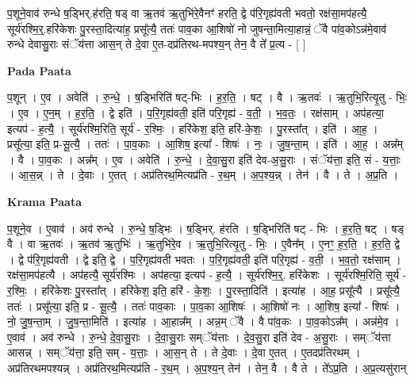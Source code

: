 \documentclass[17pt]{extarticle}
\begin{document}
प॒शूने॒वाव॑ रुन्धे ष॒ड्भिर्.ह॑रति॒ षड् वा ऋ॒तव॑ ऋ॒तुभि॑रे॒वैनꣳ॑ हरति॒ द्वे प॑रि॒गृह्य॑वती भवतो॒ रक्ष॑सा॒मप॑हत्यै॒ सूर्य॑रश्मि॒र्॒.हरि॑केशः पु॒रस्ता॒दित्या॑ह॒ प्रसू᳚त्यै॒ ततः॑ पाव॒का आ॒शिषो॑ नो जुषन्ता॒मित्या॒हान्नं॒ ॅवै पा॑व॒कोऽन्न॑मे॒वाव॑ रुन्धे देवासु॒राः संॅय॑त्ता आस॒न् ते दे॒वा ए॒त-दप्र॑तिरथ-मपश्य॒न् तेन॒ वै ते᳚ प्र॒त्य - [  ] \newline

\textbf{Pada Paata} \newline

प॒शून् । ए॒व । अवेति॑ । रु॒न्धे॒ । ष॒ड्भिरिति॑ षट्-भिः । ह॒र॒ति॒ । षट् । वै । ऋ॒तवः॑ । ऋ॒तुभि॒रित्यृ॒तु - भिः॒ । ए॒व । ए॒न॒म् । ह॒र॒ति॒ । द्वे इति॑ । प॒रि॒गृह्य॑वती॒ इति॑ परि॒गृह्य॑ - व॒ती॒ । भ॒व॒तः॒ । रक्ष॑साम् । अप॑हत्या॒ इत्यप॑ - ह॒त्यै॒ । सूर्य॑रश्मि॒रिति॒ सूर्य॑ - र॒श्मिः॒ । हरि॑केश॒ इति॒ हरि॑-के॒शः॒ । पु॒रस्ता᳚त् । इति॑ । आ॒ह॒ । प्रसू᳚त्या॒ इति॒ प्र-सू॒त्यै॒ । ततः॑ । पा॒व॒काः । आ॒शिष॒ इत्या᳚ - शिषः॑ । नः॒ । जु॒ष॒न्ता॒म् । इति॑ । आ॒ह॒ । अन्न᳚म् । वै । पा॒व॒कः । अन्न᳚म् । ए॒व । अवेति॑ । रु॒न्धे॒ । दे॒वा॒सु॒रा इति॑ देव-अ॒सु॒राः । संॅय॑त्ता॒ इति॒ सं - य॒त्ताः॒ । आ॒स॒न्न् । ते । दे॒वाः । ए॒तत् । अप्र॑तिरथ॒मित्यप्र॑ति - र॒थ॒म् । अ॒प॒श्य॒न्न् । तेन॑ । वै । ते । अ॒प्र॒ति ।  \newline


\textbf{Krama Paata} \newline

प॒शूने॒व । ए॒वाव॑ । अव॑ रुन्धे । रु॒न्धे॒ ष॒ड्भिः । ष॒ड्भिर्. ह॑रति । ष॒ड्भिरिति॑ षट् - भिः । ह॒र॒ति॒ षट् । षड् वै । वा ऋ॒तवः॑ । ऋ॒तव॑ ऋ॒तुभिः॑ । ऋ॒तुभि॑रे॒व । ऋ॒तुभि॒रित्यृ॒तु - भिः॒ । ए॒वैन᳚म् । ए॒नꣳ॒॒ ह॒र॒ति॒ । ह॒र॒ति॒ द्वे । द्वे प॑रि॒गृह्य॑वती । द्वे इति॒ द्वे । प॒रि॒गृह्य॑वती भवतः । प॒रि॒गृह्य॑वती॒ इति॑ परि॒गृह्य॑ - व॒ती॒ । भ॒व॒तो॒ रक्ष॑साम् । रक्ष॑सा॒मप॑हत्यै । अप॑हत्यै॒ सूर्य॑रश्मिः । अप॑हत्या॒ इत्यप॑ - ह॒त्यै॒ । सूर्य॑रश्मि॒र्॒. हरि॑केशः । सूर्य॑रश्मि॒रिति॒ सूर्य॑ - र॒श्मिः॒ । हरि॑केशः पु॒रस्ता᳚त् । हरि॑केश॒ इति॒ हरि॑ - के॒शः॒ । पु॒रस्ता॒दिति॑ । इत्या॑ह । आ॒ह॒ प्रसू᳚त्यै । प्रसू᳚त्यै॒ ततः॑ । प्रसू᳚त्या॒ इति॒ प्र - सू॒त्यै॒ । ततः॑ पाव॒काः । पा॒व॒का आ॒शिषः॑ । आ॒शिषो॑ नः । आ॒शिष॒ इत्या᳚ - शिषः॑ । नो॒ जु॒ष॒न्ता॒म् । जु॒ष॒न्ता॒मिति॑ । इत्या॑ह । आ॒हान्न᳚म् । अन्न॒म् ॅवै । वै पा॑व॒कः । पा॒व॒कोऽन्न᳚म् । अन्न॑मे॒व । ए॒वाव॑ । अव॑ रुन्धे । रु॒न्धे॒ दे॒वा॒सु॒राः । दे॒वा॒सु॒राः सम्ॅय॑त्ताः । दे॒व॒सु॒रा इति॑ देव - अ॒सु॒राः । सम्ॅय॑त्ता आसन्न् । सम्ॅय॑त्ता॒ इति॒ सम् - य॒त्ताः॒ । आ॒स॒न् ते । ते दे॒वाः । दे॒वा ए॒तत् । ए॒तदप्र॑तिरथम् । अप्र॑तिरथमपश्यन्न् । अप्र॑तिरथ॒मित्यप्र॑ति - र॒थ॒म् । अ॒प॒श्य॒न् तेन॑ । तेन॒ वै । वै ते । ते᳚ऽप्र॒ति । अ॒प्र॒त्यसु॑रान् \newline
\end{document}

